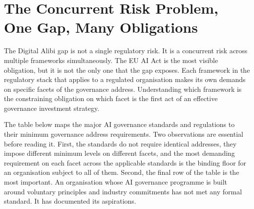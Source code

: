 \scenebreak

\section{The Concurrent Risk Problem, One Gap, Many Obligations}

The Digital Alibi gap is not a single regulatory risk. It is a concurrent risk across multiple frameworks simultaneously. The EU AI Act is the most visible obligation, but it is not the only one that the gap exposes. Each framework in the regulatory stack that applies to a regulated organisation makes its own demands on specific facets of the governance address. Understanding which framework is the constraining obligation on which facet is the first act of an effective governance investment strategy.

The table below maps the major AI governance standards and regulations to their minimum governance address requirements. Two observations are essential before reading it. First, the standards do not require identical addresses, they impose different minimum levels on different facets, and the most demanding requirement on each facet across the applicable standards is the binding floor for an organisation subject to all of them. Second, the final row of the table is the most important. An organisation whose AI governance programme is built around voluntary principles and industry commitments has not met any formal standard. It has documented its aspirations.

